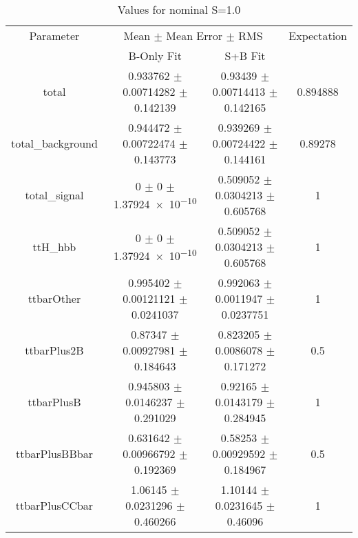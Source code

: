 \begin{table}
\centering
\caption{Values for nominal S=1.0}
\begin{tabular}{cccc}
\toprule
Parameter & \multicolumn{2}{c}{Mean $\pm$ Mean Error $\pm$ RMS} & Expectation\\
 & B-Only Fit & S+B Fit & \\
\midrule
total & \num{0.933762} $\pm$ \num{0.00714282} $\pm$ \num{0.142139} & \num{0.93439} $\pm$ \num{0.00714413} $\pm$ \num{0.142165} & \num{0.894888}\\
total\_background & \num{0.944472} $\pm$ \num{0.00722474} $\pm$ \num{0.143773} & \num{0.939269} $\pm$ \num{0.00724422} $\pm$ \num{0.144161} & \num{0.89278}\\
total\_signal & \num{0} $\pm$ \num{0} $\pm$ \num{1.37924e-10} & \num{0.509052} $\pm$ \num{0.0304213} $\pm$ \num{0.605768} & \num{1}\\
ttH\_hbb & \num{0} $\pm$ \num{0} $\pm$ \num{1.37924e-10} & \num{0.509052} $\pm$ \num{0.0304213} $\pm$ \num{0.605768} & \num{1}\\
ttbarOther & \num{0.995402} $\pm$ \num{0.00121121} $\pm$ \num{0.0241037} & \num{0.992063} $\pm$ \num{0.0011947} $\pm$ \num{0.0237751} & \num{1}\\
ttbarPlus2B & \num{0.87347} $\pm$ \num{0.00927981} $\pm$ \num{0.184643} & \num{0.823205} $\pm$ \num{0.0086078} $\pm$ \num{0.171272} & \num{0.5}\\
ttbarPlusB & \num{0.945803} $\pm$ \num{0.0146237} $\pm$ \num{0.291029} & \num{0.92165} $\pm$ \num{0.0143179} $\pm$ \num{0.284945} & \num{1}\\
ttbarPlusBBbar & \num{0.631642} $\pm$ \num{0.00966792} $\pm$ \num{0.192369} & \num{0.58253} $\pm$ \num{0.00929592} $\pm$ \num{0.184967} & \num{0.5}\\
ttbarPlusCCbar & \num{1.06145} $\pm$ \num{0.0231296} $\pm$ \num{0.460266} & \num{1.10144} $\pm$ \num{0.0231645} $\pm$ \num{0.46096} & \num{1}\\
\bottomrule
\end{tabular}
\end{table}